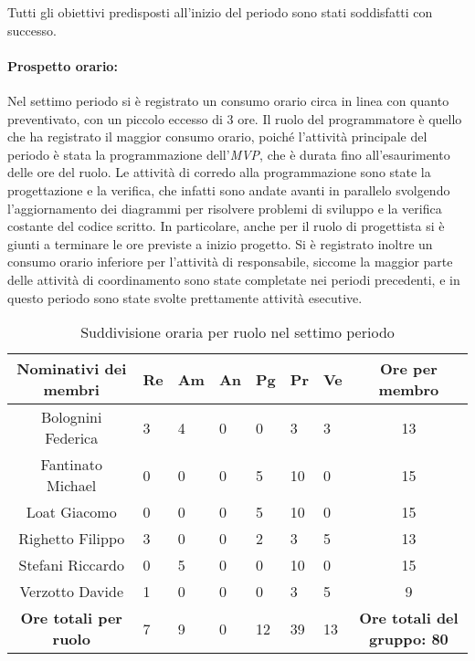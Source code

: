 Tutti gli obiettivi predisposti all'inizio del periodo sono stati soddisfatti con successo.\\

\paragraph{Prospetto orario: }
Nel settimo periodo si è registrato un consumo orario circa in linea con quanto preventivato, con un piccolo eccesso di 3 ore. Il ruolo del programmatore è quello che ha registrato il maggior consumo orario, poiché l'attività principale del periodo è stata la programmazione dell'\emph{MVP}, che è durata fino all'esaurimento delle ore del ruolo. Le attività di corredo alla programmazione sono state la progettazione e la verifica, che infatti sono andate avanti in parallelo svolgendo l'aggiornamento dei diagrammi per risolvere problemi di sviluppo e la verifica costante del codice scritto. In particolare, anche per il ruolo di progettista si è giunti a terminare le ore previste a inizio progetto. Si è registrato inoltre un consumo orario inferiore per l'attività di responsabile, siccome la maggior parte delle attività di coordinamento sono state completate nei periodi precedenti, e in questo periodo sono state svolte prettamente attività esecutive.\\
\begin{table}[h!]
    \centering
    \renewcommand{\arraystretch}{1.5}
    \begin{tabularx}{\textwidth}{|c|X|X|X|X|X|X|c|}\hline
    \rowcolor[HTML]{FFD700} 
    \textbf{Nominativi dei membri} & \textbf{Re} & \textbf{Am} & \textbf{An} & \textbf{Pg} & \textbf{Pr} & \textbf{Ve} & \textbf{Ore per membro} \\ \hline
    Bolognini Federica & 3 & 4 & 0 & 0 & 3 & 3 & 13  \\ \hline
    Fantinato Michael  & 0 & 0 & 0 & 5 & 10 & 0 & 15  \\ \hline
    Loat Giacomo       & 0 & 0 & 0 & 5 & 10 & 0 & 15 \\ \hline
    Righetto Filippo   & 3 & 0 & 0 & 2 & 3 & 5 & 13  \\ \hline
    Stefani Riccardo   & 0 & 5 & 0 & 0 & 10 & 0 & 15 \\ \hline
    Verzotto Davide    & 1 & 0 & 0 & 0 & 3 & 5 & 9  \\ \hline
    \rowcolor[HTML]{FFD700}
    \textbf{Ore totali per ruolo} & 7 & 9 & 0 & 12 & 39 & 13 & \textbf{Ore totali del gruppo: 80} \\ \hline
    \end{tabularx}
    \caption{Suddivisione oraria per ruolo nel settimo periodo}
\end{table}

